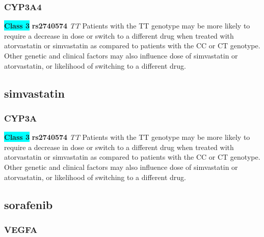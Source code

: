 \documentclass{book}
\begin{document}
\subsubsection{ CYP3A4 }

\begin{center}
\textbf{\colorbox{cyan} {Class 3}} \textbf{ rs2740574 } \textit{ TT }
Patients with the TT genotype may be more likely to require a decrease in dose or switch to a different drug when treated with atorvastatin or simvastatin as compared to patients with the CC or CT genotype. Other genetic and clinical factors may also influence dose of simvastatin or atorvastatin, or likelihood of switching to a different drug.


\end{center}\subsection{ simvastatin }


\subsubsection{ CYP3A }

\begin{center}
\textbf{\colorbox{cyan} {Class 3}} \textbf{ rs2740574 } \textit{ TT }
Patients with the TT genotype may be more likely to require a decrease in dose or switch to a different drug when treated with atorvastatin or simvastatin as compared to patients with the CC or CT genotype. Other genetic and clinical factors may also influence dose of simvastatin or atorvastatin, or likelihood of switching to a different drug.


\end{center}\subsection{ sorafenib }


\subsubsection{ VEGFA }
\end{document}
